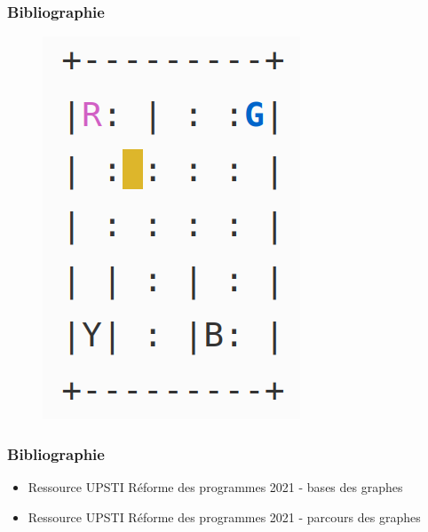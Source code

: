 \begin{frame}[fragile]
\frametitle{Bibliographie}
\begin{figure}
\vspace{-0.5cm}
  \begin{center}
    \includegraphics[width=0.9\linewidth]{img/qlearning2}
  \end{center}
\end{figure}

\end{frame}

\begin{frame}[fragile]
\frametitle{Bibliographie}
\begin{itemize}
\item Ressource UPSTI Réforme des programmes 2021 - bases des graphes
\item Ressource UPSTI Réforme des programmes 2021 - parcours des graphes
\end{itemize}

\end{frame}


